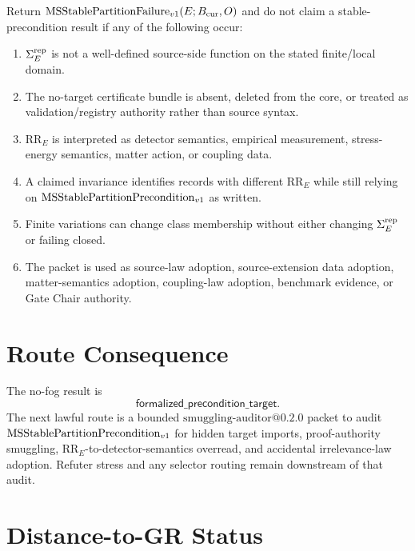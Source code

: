 Return \(\mathrm{MSStablePartitionFailure}_{v1}(E;B_{\mathrm{cur}},O)\) and do not claim a stable-precondition result
if any of the following occur:
\begin{enumerate}
  \item \(\Sigma^{\mathrm{rep}}_E\) is not a well-defined source-side function on the stated
    finite/local domain.
  \item The no-target certificate bundle is absent, deleted from the core, or
    treated as validation/registry authority rather than source syntax.
  \item \(\mathrm{RR}_E\) is interpreted as detector semantics, empirical
    measurement, stress-energy semantics, matter action, or coupling data.
  \item A claimed invariance identifies records with different
    \(\mathrm{RR}_E\) while still relying on \(\mathrm{MSStablePartitionPrecondition}_{v1}\) as written.
  \item Finite variations can change class membership without either
    changing \(\Sigma^{\mathrm{rep}}_E\) or failing closed.
  \item The packet is used as source-law adoption, source-extension data
    adoption, matter-semantics adoption, coupling-law adoption, benchmark
    evidence, or Gate Chair authority.
\end{enumerate}

\section{Route Consequence}

The no-fog result is
\[
  \mathsf{formalized\_precondition\_target}.
\]
The next lawful route is a bounded
\(\mathrm{smuggling\mbox{-}auditor@0.2.0}\) packet to audit
\(\mathrm{MSStablePartitionPrecondition}_{v1}\) for hidden target imports, proof-authority smuggling,
\(\mathrm{RR}_E\)-to-detector-semantics overread, and accidental
irrelevance-law adoption. Refuter stress and any selector routing remain
downstream of that audit.

\section{Distance-to-GR Status}

